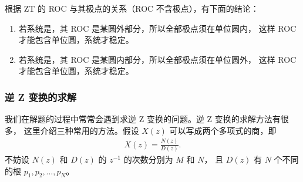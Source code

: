 \begin{corollary}
    根据 ZT 的 ROC 与其极点的关系（ROC 不含极点），有下面的结论：
    \begin{enumerate}
        \item 若系统是，其 ROC 是某圆外部分，所以全部极点须在单位圆内，
            这样 ROC 才能包含单位圆，系统才稳定。
        \item 若系统是，其 ROC 是某圆内部分，所以全部极点须在单位圆外，
            这样 ROC 才能包含单位圆，系统才稳定。
    \end{enumerate}
\end{corollary}

\subsubsection{逆 Z 变换的求解}

我们在解题的过程中常常会遇到求逆 Z 变换的问题。逆 Z 变换的求解方法有很多，
这里介绍三种常用的方法。假设 $X(z)$ 可以写成两个多项式的商，即
\begin{align*}
    X(z) = \frac{N(z)}{D(z)}.
\end{align*}
不妨设 $N(z)$ 和 $D(z)$ 的 $z^{-1}$ 的次数分别为 $M$ 和 $N$，
且 $D(z)$ 有 $N$ 个不同的根 $p_1, p_2, \ldots, p_N$。

